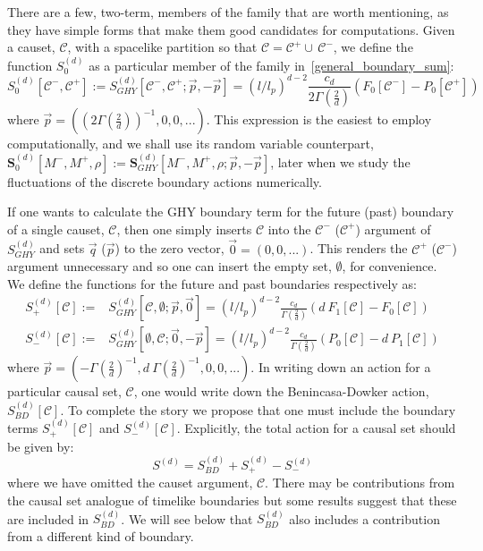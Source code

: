 \documentclass[12pt]{article}
\newcommand{\be}{\begin{equation}}
\newcommand{\ee}{\end{equation}}
\newcommand{\F}[1]{F_{#1}}
\renewcommand{\P}[1]{P_{#1}}
\begin{document}
There are a few, two-term, members of the family that are worth mentioning, as they have simple forms that make them good candidates for computations. Given a causet, $\mathcal{C}$, with a spacelike partition so that $\mathcal C = \mathcal C^+ \cup\, \mathcal C^-$, we define the function $S^{ (d)}_0$ as a particular member of the family in~\eqref{general_boundary_sum}:
\be\label{eq:min_max_simple_formula}
S^{ (d)}_{0}\left[\mathcal{C}^-,\mathcal{C}^+\right]:=S^{ (d)}_{GHY}\left[\mathcal{C}^-,\mathcal{C}^+;\vec{p}, -\vec{p} \right]=\left (l/l_p\right)^{d-2}\frac{c_{d}}{2\Gamma\left (\frac{2}{d} \right)}\left ( \F{0}\left[\mathcal{C}^- \right] - \P{0}\left[\mathcal{C}^+ \right] \right)
\ee
where $\vec{p}=\left (\left (2\Gamma\left (\frac{2}{d} \right)\right)^{-1},0,0,...\right)$.
This expression is the easiest to employ computationally, and we shall use its random variable counterpart, $\textbf{S}^{ (d)}_{0}\left[M^-,M^+,\rho\right]:=\textbf{S}^{ (d)}_{GHY}\left[M^-,M^+,\rho;\vec{p}, -\vec{p} \right]$, later when we study the fluctuations of the discrete boundary actions numerically.

If one wants to calculate the GHY boundary term for the future (past) boundary of a single causet, $\mathcal{C}$, then one simply inserts $\mathcal{C}$ into the $\mathcal{C}^-$ ($\mathcal{C}^+$) argument of $S^{ (d)}_{GHY}$ and sets $\vec{q}$ ($\vec{p}$) to the zero vector, $\vec{0}= (0,0,...)$. This renders the $\mathcal{C}^+$ ($\mathcal{C}^-$) argument unnecessary and so one can insert the empty set, $\emptyset$, for convenience. We define the functions for the future and past boundaries respectively as:
\begin{align}\label{eq:future_past_boundary_terms1}
S^{ (d)}_{+}[\mathcal{C}]:= & S^{ (d)}_{GHY}\left[\mathcal{C},\emptyset;\vec{p},\vec{0}\right] =\left (l/l_p\right)^{d-2}\frac{c_{d}}{\Gamma\left (\frac{2}{d} \right)}\left ( d\:\F{1}\left[\mathcal{C} \right] - \F{0}\left[\mathcal{C} \right] \right)
\\
\label{eq:future_past_boundary_terms2}
S^{ (d)}_{-}[\mathcal{C}]:= & S^{ (d)}_{GHY}\left[\emptyset,\mathcal{C};\vec{0},-\vec{p}\right] =\left (l/l_p\right)^{d-2}\frac{c_{d}}{\Gamma\left (\frac{2}{d} \right)}\left ( \P{0}\left[\mathcal{C} \right] - d\: \P{1}\left[\mathcal{C} \right] \right)
\end{align}
where $\vec{p}=\left (-\Gamma\left (\frac{2}{d} \right)^{-1},d\:\Gamma\left (\frac{2}{d} \right)^{-1},0,0,...\right)$. In writing down an action for a particular causal set, $\mathcal{C}$, one would write down the Benincasa-Dowker action, $S^{ (d)}_{BD}[\mathcal{C}]$. To complete the story we propose that one must include the boundary terms $S^{ (d)}_{+}[\mathcal{C}]$ and $S^{ (d)}_{-}[\mathcal{C}]$. Explicitly, the total action for a causal set should be given by:
\be\label{eq:total_causet_action}
S^{ (d)}=S^{ (d)}_{BD}+S^{ (d)}_{+}-S^{ (d)}_{-}
\ee
where we have omitted the causet argument, $\mathcal{C}$. There may be contributions from the causal set analogue of timelike boundaries but some results suggest that these are included in $S^{ (d)}_{BD}$. We will see below that $S^{ (d)}_{BD}$ also includes a contribution from a different kind of boundary.
\end{document}
